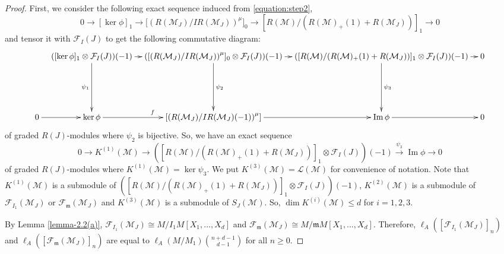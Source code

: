 \documentclass[10pt,a4paper]{amsart}
\def\M{{\mathcal M}}
\newcommand{\m}{\mathfrak m}
\def\F{{\mathcal F}}
\def\L{{\mathcal L}}
\DeclareMathOperator{\im}{Im}
\begin{document}
\begin{proof}
First, we consider the following exact sequence induced from \eqref{equation:step2},
	$$0\to [\ker\phi]_1\to {[(R(\M_J)/IR(\M_J))}^\mu]_0\to [R(\M)/(R(\M)_+(1)+R(\M_J))]_1\to 0$$
	and tensor it with $\F_I(J)$ to get the following commutative diagram:
	{\tiny\[
	\xymatrixrowsep{20mm}\xymatrixcolsep{3mm}
	\xymatrix{
		& ([\ker \phi]_1\otimes \F_I(J))(-1) \ar[r] \ar[d]_{\psi_1}  & ({[(R(\M_J)/IR(\M_J))}^\mu]_0\otimes \F_I(J))(-1) \ar[r] \ar[d]^{\psi_2} & ([R(\M)/(R(\M)_+(1)+R(\M_J))]_1 \otimes \F_I(J))(-1) \ar[r]\ar[d]^{\psi_3} & 0 \\
		0 \ar[r] & \ker \phi\ar[r]^{f}  &  [{(R(\M_J)/IR(\M_J)(-1))}^\mu] \ar[r]  & \im{\phi} \ar[r] & 0 
	}
	\]
    }
	of graded $R(J)$-modules where $\psi_2$ is bijective. So, we have an exact sequence \begin{equation}\label{equation:step3}
		0\to K^{(1)}(\M)\to ([R(\M)/(R(\M)_+(1)+R(\M_J))]_1\otimes\F_I(J))(-1)\xrightarrow{\psi_3}\im  \phi\to 0
	\end{equation}
	of graded $R(J)$-modules where $K^{(1)}(\M)=\ker\psi_3$. We put $K^{(3)}(\M)=\L(\M)$ for convenience of notation. Note that $K^{(1)}(\M)$ is a submodule of $ ([R(\M)/(R(\M)_+(1)+R(\M_J))]_1\otimes \F_I(J))(-1)$, $K^{(2)}(\M)$ is a submodule of $ \F_{I_1}(\M_J)$ or $\F_{\m}(\M_J)$  and $K^{(3)}(\M)$ is a submodule of $ S_J(\M)$. So, $\dim K^{(i)}(\M)\leq d$ for $i=1,2,3$.   

By Lemma \ref{lemma-2.2(a)},   $\F_{I_1}(\M_J)\cong M/I_1M[X_1,\ldots,X_d]$ and $\F_{\m}(\M_J)\cong M/\m M[X_1,\ldots,X_d].$ Therefore,  $\ell_A([\F_{I_1}(\M_J)]_n)$ and $\ell_A([\F_{\m}(\M_J)]_n)$ are equal to  $\ell_A(M/M_1)\binom{n+d-1}{d-1}$ for all $n\geq 0.$ 


\end{proof}
\end{document}
